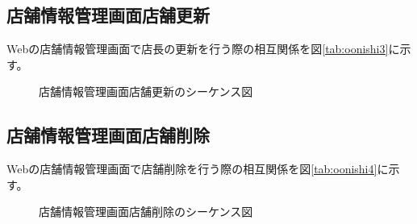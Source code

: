 \documentclass[a4j]{jarticle}
\begin{document}
\subsection{店舗情報管理画面店舗更新}
Webの店舗情報管理画面で店長の更新を行う際の相互関係を図\ref {tab:oonishi3}に示す。
\begin{figure}[hb]
\begin{center}
\caption{店舗情報管理画面店舗更新のシーケンス図}
\label{oonishi3}
\end{center}
\end{figure}
\subsection{店舗情報管理画面店舗削除}
Webの店舗情報管理画面で店舗削除を行う際の相互関係を図\ref {tab:oonishi4}に示す。
\begin{figure}[hb]
\begin{center}
\caption{店舗情報管理画面店舗削除のシーケンス図}
\label{oonishi4}
\end{center}
\end{figure}
\end{document}

